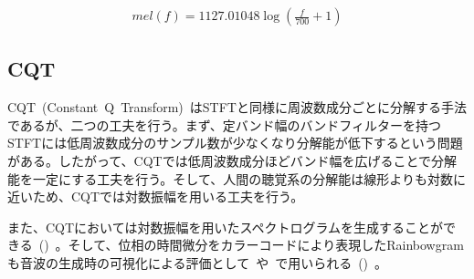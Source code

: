 \begin{align}
    \label{eq:mel}
    mel(f)=1127.01048\log{(\frac{f}{700}+1)}
\end{align}

\subsection{CQT}

CQT~(Constant~Q~Transform)~\cite{CQT}はSTFTと同様に周波数成分ごとに分解する手法であるが、二つの工夫を行う。まず、定バンド幅のバンドフィルターを持つSTFTには低周波数成分のサンプル数が少なくなり分解能が低下するという問題がある。したがって、CQTでは低周波数成分ほどバンド幅を広げることで分解能を一定にする工夫を行う。そして、人間の聴覚系の分解能は線形よりも対数に近いため、CQTでは対数振幅を用いる工夫を行う。

また、CQTにおいては対数振幅を用いたスペクトログラムを生成することができる~()~。そして、位相の時間微分をカラーコードにより表現したRainbowgramも音波の生成時の可視化による評価として~\cite{NSynth}や~\cite{GANSynth}で用いられる~()~。

